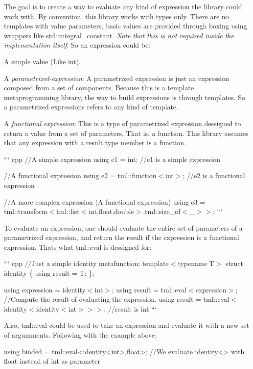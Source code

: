 The goal is to create a way to evaluate any kind of expression the library could work with. By convention, this library works with types only. There are no templates with value parameters, basic values are provided through boxing using wrappers like {\ttfamily std\+::integral\+\_\+constant}. {\itshape Note that this is not required inside the implementation itself}. So an expression could be\+:
\begin{DoxyEnumerate}
\item A simple value (Like {\ttfamily int}).
\item A {\itshape parametrized-\/expression}\+: A parametrized expression is just an expression composed from a set of components. Because this is a template metaprogramming library, the way to build expressions is through templates. So a parametrized expressions refers to any kind of template.
\item A {\itshape functional expression}\+: This is a type of parametrized expression dessigned to return a value from a set of parameters. That is, a function. This library assumes that any expression with a {\ttfamily result} type member is a function.
\end{DoxyEnumerate}

``` cpp //\+A simple expression using e1 = int; //e1 is a simple expression

//\+A functional expression using e2 = tml\+::function$<$int$>$; //e2 is a functional expression

//\+A more complex expression (A functional expression) using e3 = tml\+::transform$<$tml\+::list$<$int,float,double$>$,tml\+::size\+\_\+of$<$\+\_$>$$>$; ```

To evaluate an expression, one should evaluate the entire set of parameters of a parametrized expression, and return the result if the expression is a functional expression. Thats what {\ttfamily tml\+::eval} is dessigned for\+:

``` cpp //\+Just a simple identity metafunction\+: template$<$typename T$>$ struct identity \{ using result = T; \};

using expression = identity$<$int$>$; using result = tml\+::eval$<$expression$>$; //\+Compute the result of evaluating the expression. using result = tml\+::eval$<$identity$<$identity$<$int$>$$>$$>$; //result is int ```

Also, {\ttfamily tml\+::eval} could be used to take an expression and evaluate it with a new set of argumments. Following with the example above\+: \begin{DoxyVerb}using binded = tml::eval<identity<int>,float>; //We evaluate identity<> with float instead of int as parameter
\end{DoxyVerb}


